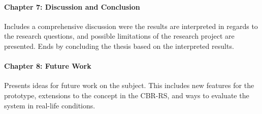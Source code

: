 \paragraph{Chapter 7: Discussion and Conclusion}
Includes a comprehensive discussion were the results are interpreted in regards to the research questions, and possible limitations of the research project are presented. Ends by concluding the thesis based on the interpreted results.

\paragraph{Chapter 8: Future Work}
Presents ideas for future work on the subject. This includes new features for the prototype, extensions to the concept in the CBR-RS, and ways to evaluate the system in real-life conditions. 


\cleardoublepage